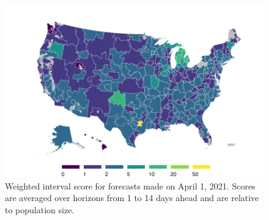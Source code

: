 \documentclass[9pt,twocolumn,twoside,lineno]{pnas-new}
\begin{document}


\paragraph{}


\begin{figure}
    \centering
    \includegraphics[width=.95\linewidth]{fig/fake-map.pdf}
    \caption{Weighted interval score for forecasts made on April 1, 2021. Scores
      are averaged over horizons from 1 to 14 days ahead and are relative to
      population size.} 
    \label{fig:fake-map}
\end{figure}
\end{document}

